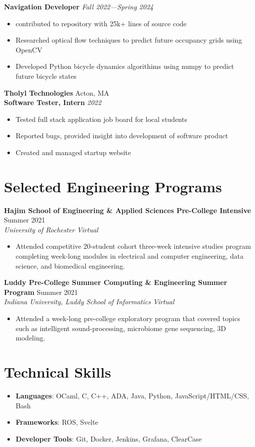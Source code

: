 \documentclass[letterpaper,10pt]{article}
\newcommand{\company}[2]{
    \vspace{6pt}
    {\large \textbf{#1}}
    \hfill
    {\normalsize {#2}}
    \\
}
\newcommand{\position}[2]{
    \vspace{4pt}
    {\normalsize \textbf {#1}}
    \hfill
    {\normalsize \textit{#2}}
    \\
}
\newcommand{\resumeEntry}[4]{
    \vspace{4pt}
    {\large \textbf{#1}}
    \hfill
    {\normalsize #2}
    \\
    \textit{#3} \hfill \textit{#4}
    \vspace{1pt}
}
\newcommand{\itemsBegin}{
    \begin{itemize}[leftmargin=0.2in, labelsep=0.05in, itemsep=0pt, parsep=1pt, topsep=0pt, partopsep=0pt]
}
\newcommand{\itemsEnd}{\end{itemize}}
\begin{document}
    \position{Navigation Developer}{Fall 2022---Spring 2024}
    \itemsBegin{}
        \item contributed to repository with 25k+ lines of source code
        \item Researched optical flow techniques to predict future occupancy grids using OpenCV
        \item Developed Python bicycle dynamics algorithims using numpy to predict future bicycle states
    \itemsEnd{}

    \company{Tholyl Technologies}{Acton, MA}

    \position{Software Tester, Intern}{2022}
    \itemsBegin
        \item Tested full stack application job board for local students
        \item Reported bugs, provided insight into development of software product
        \item Created and managed startup website
    \itemsEnd


\section{Selected Engineering Programs}


    \resumeEntry{Hajim School of Engineering \& Applied Sciences Pre-College Intensive}
        {Summer 2021}
        {University of Rochester}
        {Virtual}

    \itemsBegin{}
        \item Attended competitive 20-student cohort three-week intensive studies program completing week-long modules in electrical and computer engineering, data science, and biomedical engineering.
    \itemsEnd{}

    \resumeEntry{Luddy Pre-College Summer Computing \& Engineering Summer Program}
        {Summer 2021}
        {Indiana University, Luddy School of Informatics}
        {Virtual}

    \itemsBegin{}
        \item Attended a week-long pre-college exploratory program that covered topics such as intelligent sound-processing, microbiome gene sequencing, 3D modeling.
    \itemsEnd{}

\section{Technical Skills}

    \itemsBegin{}
        \item \textbf{Languages}{: OCaml, C, C++, ADA, Java, Python, JavaScript/HTML/CSS, Bash}
        \item \textbf{Frameworks}{: ROS, Svelte}
        \item \textbf{Developer Tools}{: Git, Docker, Jenkins, Grafana, ClearCase}
    \itemsEnd{}
\end{document}
